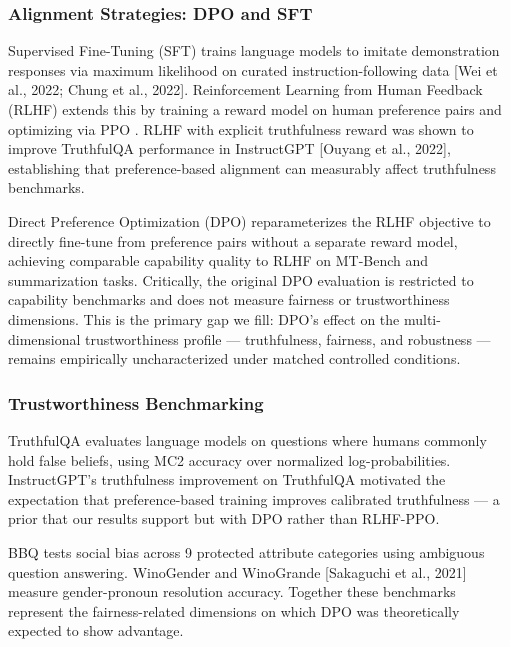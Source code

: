 
\subsubsection{Alignment Strategies: DPO and SFT}

Supervised Fine-Tuning (SFT) trains language models to imitate demonstration responses
via maximum likelihood on curated instruction-following data [Wei et al., 2022; Chung et al., 2022].
Reinforcement Learning from Human Feedback (RLHF) extends this by training a reward model
on human preference pairs and optimizing via PPO \citep{Ouyang2022Training}. RLHF with explicit
truthfulness reward was shown to improve TruthfulQA performance in InstructGPT [Ouyang et al.,
2022], establishing that preference-based alignment can measurably affect truthfulness benchmarks.

Direct Preference Optimization (DPO) \citep{Rafailov2023Direct} reparameterizes the RLHF
objective to directly fine-tune from preference pairs without a separate reward model, achieving
comparable capability quality to RLHF on MT-Bench and summarization tasks. Critically, the
original DPO evaluation is restricted to capability benchmarks and does not measure fairness
or trustworthiness dimensions. This is the primary gap we fill: DPO's effect on the
multi-dimensional trustworthiness profile --- truthfulness, fairness, and robustness --- remains
empirically uncharacterized under matched controlled conditions.

\subsubsection{Trustworthiness Benchmarking}

TruthfulQA \citep{Lin2022TruthfulQA} evaluates language models on questions where humans commonly
hold false beliefs, using MC2 accuracy over normalized log-probabilities. InstructGPT's
truthfulness improvement \citep{Ouyang2022Training} on TruthfulQA motivated the expectation that
preference-based training improves calibrated truthfulness --- a prior that our results support
but with DPO rather than RLHF-PPO.

BBQ \citep{Parrish2022BBQ} tests social bias across 9 protected attribute categories using
ambiguous question answering. WinoGender \citep{Rudinger2018Gender} and WinoGrande [Sakaguchi
et al., 2021] measure gender-pronoun resolution accuracy. Together these benchmarks represent
the fairness-related dimensions on which DPO was theoretically expected to show advantage.

